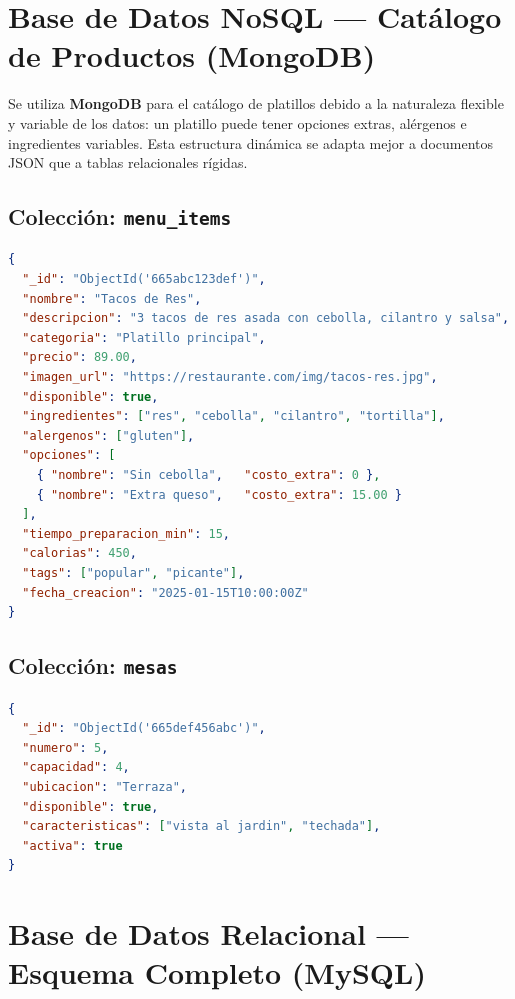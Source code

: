 \documentclass[12pt,a4paper]{article}
\begin{document}
\section{Base de Datos NoSQL --- Catálogo de Productos (MongoDB)}

Se utiliza \textbf{MongoDB} para el catálogo de platillos debido a la naturaleza flexible
y variable de los datos: un platillo puede tener opciones extras, alérgenos e ingredientes
variables. Esta estructura dinámica se adapta mejor a documentos JSON que a tablas relacionales rígidas.

\subsection{Colección: \texttt{menu\_items}}

\begin{lstlisting}[language=json, caption={Documento JSON --- Colección menu\_items}]
{
  "_id": "ObjectId('665abc123def')",
  "nombre": "Tacos de Res",
  "descripcion": "3 tacos de res asada con cebolla, cilantro y salsa",
  "categoria": "Platillo principal",
  "precio": 89.00,
  "imagen_url": "https://restaurante.com/img/tacos-res.jpg",
  "disponible": true,
  "ingredientes": ["res", "cebolla", "cilantro", "tortilla"],
  "alergenos": ["gluten"],
  "opciones": [
    { "nombre": "Sin cebolla",   "costo_extra": 0 },
    { "nombre": "Extra queso",   "costo_extra": 15.00 }
  ],
  "tiempo_preparacion_min": 15,
  "calorias": 450,
  "tags": ["popular", "picante"],
  "fecha_creacion": "2025-01-15T10:00:00Z"
}
\end{lstlisting}

\subsection{Colección: \texttt{mesas}}

\begin{lstlisting}[language=json, caption={Documento JSON --- Colección mesas}]
{
  "_id": "ObjectId('665def456abc')",
  "numero": 5,
  "capacidad": 4,
  "ubicacion": "Terraza",
  "disponible": true,
  "caracteristicas": ["vista al jardin", "techada"],
  "activa": true
}
\end{lstlisting}

\section{Base de Datos Relacional --- Esquema Completo (MySQL)}
\end{document}
